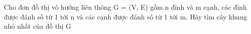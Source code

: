 Cho đơn đồ thị vô hướng liên thông G = (V, E) gồm n đỉnh và m cạnh, các đỉnh được đánh số từ 1 tới n và các cạnh được đánh số từ 1 tới m. Hãy tìm cây khung nhỏ nhất của đồ thị G  

\